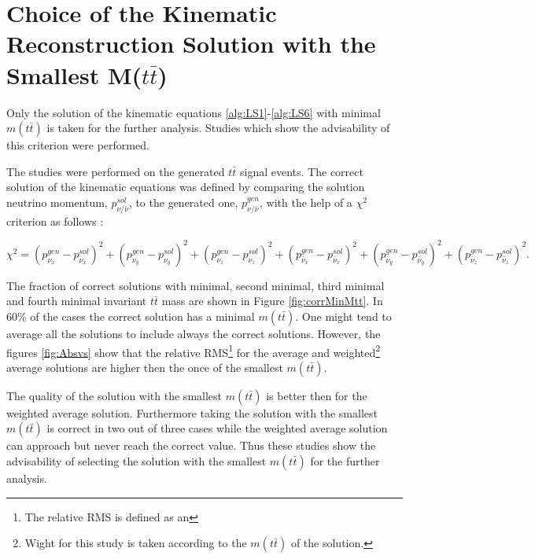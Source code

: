 \chapter{Choice of the Kinematic Reconstruction Solution with the Smallest M($t\bar{t}$)}\label{appendix:mtt}

Only the solution of the kinematic equations \ref{alg:LS1}-\ref{alg:LS6} with minimal $m(t\bar{t})$ is taken for the further analysis.
Studies which show the advisability of this criterion were performed.

The studies were performed on the generated $t\bar{t}$ signal events. The correct solution of the kinematic equations was defined by comparing the 
solution neutrino momentum, $p_{\nu/\bar{\nu}}^{sol}$, to the generated one, $p_{\nu/\bar{\nu}}^{gen}$, with the help of a $\chi^{2}$ criterion as follows \cite{Sonnenschein:2005ed}:

\begin{equation}
 \chi^{2} = (p_{\nu_{x}}^{gen} - p_{\nu_{x}}^{sol})^{2} + (p_{\nu_{y}}^{gen} - p_{\nu_{y}}^{sol})^{2} + (p_{\nu_{z}}^{gen} - p_{\nu_{z}}^{sol})^{2} + (p_{\bar{\nu}_{x}}^{gen} - p_{\bar{\nu}_{x}}^{sol})^{2} +
 (p_{\bar{\nu}_{y}}^{gen} - p_{\bar{\nu}_{y}}^{sol})^{2} + (p_{\bar{\nu}_{z}}^{gen} - p_{\bar{\nu}_{z}}^{sol})^{2}.
\end{equation}

The fraction of correct solutions with minimal, second minimal, third minimal and fourth minimal invariant $t\bar{t}$ mass are shown in Figure \ref{fig:corrMinMtt}. In $60\%$ of 
the cases the correct solution has a minimal $m(t\bar{t})$. One might tend to average all the solutions to include always the correct solutions. However, the figures \ref{fig:Absvs}
show that the relative RMS\footnote{The relative RMS is defined as an } for the average and weighted\footnote{Wight for this study is taken according to the $m(t\bar{t})$ of the solution.} average solutions are higher then the once
of the smallest $m(t\bar{t})$.

The quality of the solution with the smallest $m(t\bar{t})$ is better then for the weighted average solution. Furthermore taking the solution with the smallest $m(t\bar{t})$ is
correct in two out of three cases while the weighted average solution can approach but never reach the correct value. Thus these studies show the advisability of selecting the
solution with the smallest $m(t\bar{t})$ for the further analysis.

